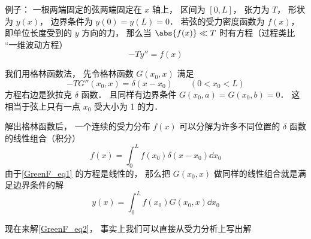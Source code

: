 
\begin{issues}
\issueDraft
\end{issues}


例子： 一根两端固定的弦两端固定在 $x$ 轴上， 区间为 $[0, L]$， 张力为 $T$， 形状为 $y(x)$， 边界条件为 $y(0) = y(L) = 0$． 若弦的受力密度函数为 $f(x)$， 即单位长度受到的 $y$ 方向的力， 那么当 $\abs{f(x)} \ll T$ 时有方程（过程类比 “一维波动方程）
\begin{equation}\label{GreenF_eq1}
-T y'' = f(x)
\end{equation}

我们用格林函数法， 先令格林函数 $G(x_0, x)$ 满足
\begin{equation}\label{GreenF_eq2}
-T G''(x_0, x) = \delta(x - x_0) \qquad (0 < x_0 < L)
\end{equation}
方程右边是狄拉克 $\delta$ 函数． 且同样有边界条件 $G(x_0, a) = G(x_0, b) = 0$． 这相当于弦上只有一点 $x_0$ 受大小为 1 的力．

解出格林函数后， 一个连续的受力分布 $f(x)$ 可以分解为许多不同位置的 $\delta$ 函数的线性组合（积分）
\begin{equation}
f(x) = \int_0^L f(x_0) \delta(x - x_0) \dd{x_0}
\end{equation}
由于\autoref{GreenF_eq1} 的方程是线性的， 那么把 $G(x_0, x)$ 做同样的线性组合就是满足边界条件的解
\begin{equation}
y(x) = \int_0^L f(x_0) G(x_0, x) \dd{x_0}
\end{equation}

现在来解\autoref{GreenF_eq2}， 事实上我们可以直接从受力分析上写出解
